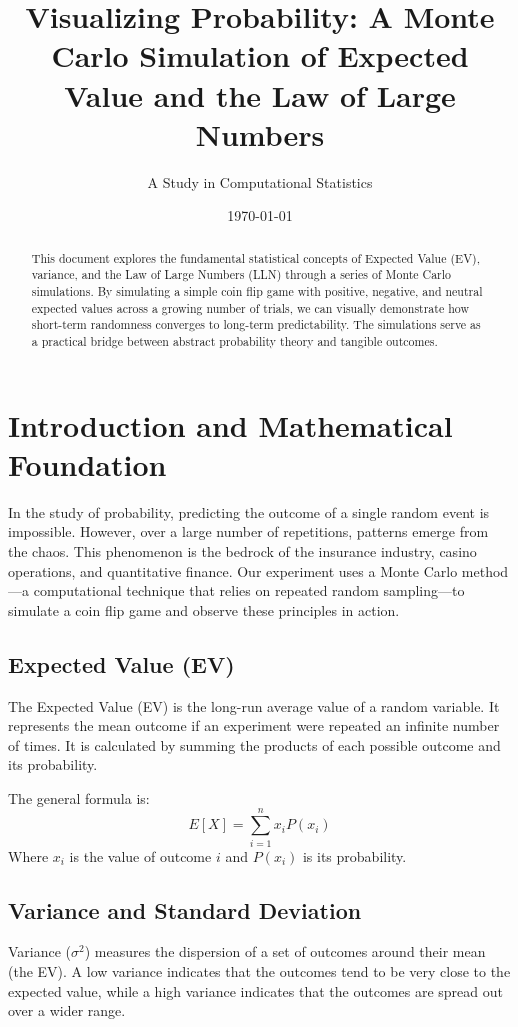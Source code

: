 \documentclass[12pt]{article}
\title{Visualizing Probability: A Monte Carlo Simulation of Expected Value and the Law of Large Numbers}
\author{A Study in Computational Statistics}
\date{\today}
\begin{document}
\maketitle

\begin{abstract}
This document explores the fundamental statistical concepts of Expected Value (EV), variance, and the Law of Large Numbers (LLN) through a series of Monte Carlo simulations. By simulating a simple coin flip game with positive, negative, and neutral expected values across a growing number of trials, we can visually demonstrate how short-term randomness converges to long-term predictability. The simulations serve as a practical bridge between abstract probability theory and tangible outcomes.
\end{abstract}

\tableofcontents
\clearpage

\section{Introduction and Mathematical Foundation}

In the study of probability, predicting the outcome of a single random event is impossible. However, over a large number of repetitions, patterns emerge from the chaos. This phenomenon is the bedrock of the insurance industry, casino operations, and quantitative finance. Our experiment uses a Monte Carlo method—a computational technique that relies on repeated random sampling—to simulate a coin flip game and observe these principles in action.

\subsection{Expected Value (EV)}
The Expected Value (EV) is the long-run average value of a random variable. It represents the mean outcome if an experiment were repeated an infinite number of times. It is calculated by summing the products of each possible outcome and its probability.

The general formula is:
\[
E[X] = \sum_{i=1}^{n} x_i P(x_i)
\]
Where $x_i$ is the value of outcome $i$ and $P(x_i)$ is its probability.

\subsection{Variance and Standard Deviation}
Variance ($\sigma^2$) measures the dispersion of a set of outcomes around their mean (the EV). A low variance indicates that the outcomes tend to be very close to the expected value, while a high variance indicates that the outcomes are spread out over a wider range.
\end{document}
